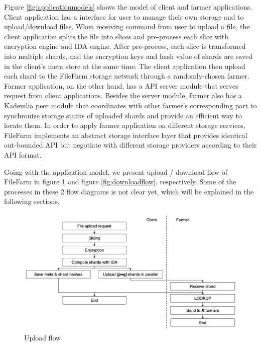 Figure \ref{fig:applicationmodels} shows the model of client and farmer applications. Client application has a interface for user to manage their own storage and to upload/download files. When receiving command from user to upload a file, the client application splits the file into slices and pre-process each slice with encryption engine and IDA engine. After pre-process, each slice is transformed into multiple shards, and the encryption keys and hash value of shards are saved in the client's meta store at the same time. The client application then upload each shard to the FileFarm storage network through a randomly-chosen farmer. Farmer application, on the other hand, has a API server module that serves request from client applications. Besides the server module, farmer also has a Kademlia peer module that coordinates with other farmer's corresponding part to synchronize storage status of uploaded shards and provide an efficient way to locate them. In order to apply farmer application on different storage services, FileFarm implements an abstract storage interface layer that provides identical out-bounded API but negotiate with different storage providers according to their API format.

Going with the application model, we present upload / download flow of FileFarm in figure \ref{fig:uploadflow} and figure \ref{fig:downloadflow}, respectively. Some of the processes in these 2 flow diagrams is not clear yet, which will be explained in the following sections.

\begin{figure}[hbt]
\centering
  \includegraphics[width=14cm]{figures/upload_flow.png}
  \caption{Upload flow}
  \label{fig:uploadflow}
\end{figure}


